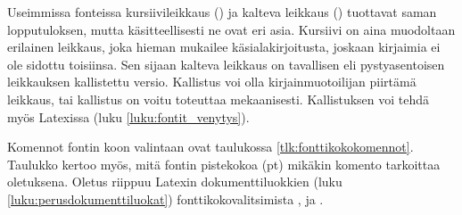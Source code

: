 Useimmissa fonteissa kursiivileikkaus () ja kalteva
leikkaus () tuottavat saman lopputuloksen, mutta
käsitteellisesti ne ovat eri asia. Kursiivi on aina muodoltaan erilainen
leikkaus, joka hieman mukailee käsialakirjoitusta, joskaan kirjaimia ei
ole sidottu toisiinsa. Sen sijaan kalteva leikkaus on tavallisen eli
pystyasentoisen leikkauksen kallistettu versio. Kallistus voi olla
kirjainmuotoilijan piirtämä leikkaus, tai kallistus on voitu toteuttaa
mekaanisesti. Kallistuksen voi tehdä myös Latexissa (luku
\ref{luku:fontit_venytys}).

Komennot fontin koon valintaan ovat taulukossa
\ref{tlk:fonttikokokomennot}. Taulukko kertoo myös, mitä fontin
pistekokoa (pt) mikäkin komento tarkoittaa oletuksena. Oletus riippuu
Latexin dokumenttiluokkien (luku \ref{luku:perusdokumenttiluokat})
fonttikokovalitsimista \koodi{10pt}, \koodi{11pt} ja \koodi{12pt}.


%

